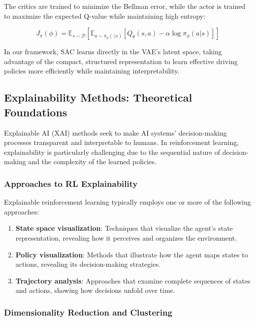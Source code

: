 \documentclass[conference]{IEEEtran}
\begin{document}
The critics are trained to minimize the Bellman error, while the actor is trained to maximize the expected Q-value while maintaining high entropy:

\begin{equation}
J_\pi(\phi) = \mathbb{E}_{s \sim \mathcal{D}}\left[\mathbb{E}_{a \sim \pi_\phi(\cdot|s)}\left[Q_\theta(s,a) - \alpha \log \pi_\phi(a|s)\right]\right]
\end{equation}


In our framework, SAC learns directly in the VAE's latent space, taking advantage of the compact, structured representation to learn effective driving policies more efficiently while maintaining interpretability.

\subsection{Explainability Methods: Theoretical Foundations}

Explainable AI (XAI) methods seek to make AI systems' decision-making processes transparent and interpretable to humans. In reinforcement learning, explainability is particularly challenging due to the sequential nature of decision-making and the complexity of the learned policies.

\subsubsection{Approaches to RL Explainability}

Explainable reinforcement learning typically employs one or more of the following approaches:

\begin{enumerate}[label=\roman*.]
    \item \textbf{State space visualization}: Techniques that visualize the agent's state representation, revealing how it perceives and organizes the environment.
    
    \item \textbf{Policy visualization}: Methods that illustrate how the agent maps states to actions, revealing its decision-making strategies.
    
    \item \textbf{Trajectory analysis}: Approaches that examine complete sequences of states and actions, showing how decisions unfold over time.
    
\end{enumerate}

\subsubsection{Dimensionality Reduction and Clustering}
\end{document}
